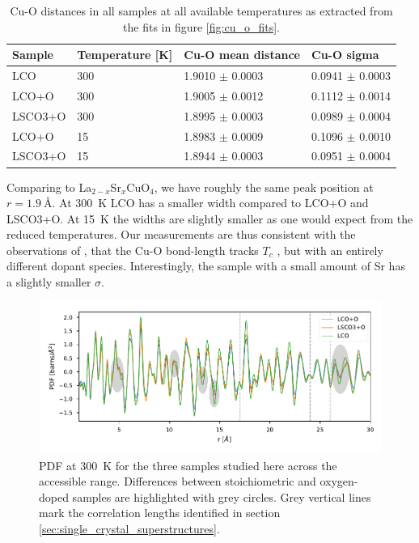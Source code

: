 \begin{table}
    \centering
    \begin{tabular}{llll}
        \toprule
          Sample & Temperature [K] &   Cu-O mean distance &           Cu-O sigma \\
        \midrule
             LCO &             300 &  1.9010 $\pm$ 0.0003 &  0.0941 $\pm$ 0.0003 \\
           LCO+O &             300 &  1.9005 $\pm$ 0.0012 &  0.1112 $\pm$ 0.0014 \\
         LSCO3+O &             300 &  1.8995 $\pm$ 0.0003 &  0.0989 $\pm$ 0.0004 \\
           LCO+O &              15 &  1.8983 $\pm$ 0.0009 &  0.1096 $\pm$ 0.0010 \\
         LSCO3+O &              15 &  1.8944 $\pm$ 0.0003 &  0.0951 $\pm$ 0.0004 \\
        \bottomrule
    \end{tabular}
    \caption{Cu-O distances in all samples at all available temperatures as extracted from the fits in figure \ref{fig:cu_o_fits}.}
    \label{tab:cu_o_fits}
\end{table}

Comparing to La$_{2-x}$Sr$_x$CuO$_{4}$, we have roughly the same peak position at $r=\SI{1.9}{\angstrom}$. At \SI{300}{\kelvin} LCO has a smaller width compared to LCO+O and LSCO3+O. At \SI{15}{\kelvin} the widths are slightly smaller as one would expect from the reduced temperatures. Our measurements are thus consistent with the observations of \cite{Bozin2000}, that the Cu-O bond-length tracks $T_c$ , but with an entirely different dopant species. Interestingly, the sample with a small amount of Sr has a slightly smaller $\sigma$.

\begin{figure}
    \centering
    \includegraphics[width=\textwidth]{fig/pdf/300k_all.pdf}
    \caption{PDF at \SI{300}{\kelvin} for the three samples studied here across the accessible range. Differences between stoichiometric and oxygen-doped samples are highlighted with grey circles. Grey vertical lines mark the correlation lengths identified in section \ref{sec:single_crystal_superstructures}.}
    \label{fig:pdf_all_300K}
\end{figure}

